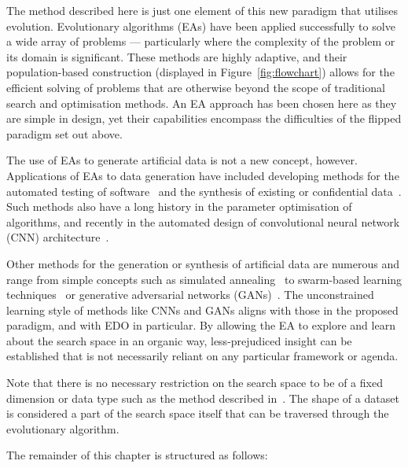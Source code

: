 
The method described here is just one element of this new paradigm that utilises
evolution. Evolutionary algorithms (EAs) have been applied successfully to solve
a wide array of problems --- particularly where the complexity of the problem or
its domain is significant. These methods are highly adaptive, and their
population-based construction (displayed in Figure~\ref{fig:flowchart}) allows
for the efficient solving of problems that are otherwise beyond the scope of
traditional search and optimisation methods. An EA approach has been chosen here
as they are simple in design, yet their capabilities encompass the difficulties
of the flipped paradigm set out above.


The use of EAs to generate artificial data is not a new concept, however.
Applications of EAs to data generation have included developing methods for the
automated testing of software~\cite{Koleejan2015,Michael2001,Sharifipour2018}
and the synthesis of existing or confidential data~\cite{Chen2016synthetic}.
Such methods also have a long history in the parameter optimisation of
algorithms, and recently in the automated design of convolutional neural network
(CNN) architecture~\cite{Suganuma2017,Sun2018}.

Other methods for the generation or synthesis of artificial data are numerous
and range from simple concepts such as simulated annealing~\cite{Matejka2017} to
swarm-based learning techniques~\cite{Abualigah2018b} or generative adversarial
networks (GANs)~\cite{Goodfellow2014}. The unconstrained learning style of
methods like CNNs and GANs aligns with those in the proposed paradigm, and with
EDO in particular. By allowing the EA to explore and learn about the search
space in an organic way, less-prejudiced insight can be established that is not
necessarily reliant on any particular framework or agenda.

Note that there is no necessary restriction on the search space to be of a fixed
dimension or data type such as the method described in~\cite{Chen2016synthetic}.
The shape of a dataset is considered a part of the search space itself that can
be traversed through the evolutionary algorithm.

The remainder of this chapter is structured as follows:

